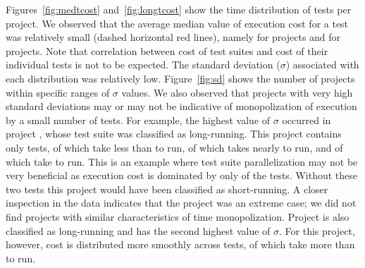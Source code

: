 \sloppy Figures~\ref{fig:medtcost} and~\ref{fig:longtcost} show the
time distribution of tests per project.  We observed that the average
median value of execution cost for a test was relatively small (dashed
horizontal red lines), namely  for \medg{} projects and
 for \longg{} projects.  Note that correlation between cost
of test suites and cost of their individual tests is not to be
expected.  The standard deviation ($\sigma$) associated with each
distribution was relatively low.  Figure~\ref{fig:sd} shows the number
of projects within specific ranges of $\sigma$ values.  We also
observed that projects with very high standard deviations may or may
not be indicative of monopolization of execution by a small number of
tests.  For example, the highest value of $\sigma$ occurred in project
, whose test suite was classified as
long-running.  This project contains only  tests,  of
which take less than  to run,  of which takes nearly
 to run, and  of which take  to run.  This is
an example where test suite parallelization may not be very beneficial
as  execution cost is dominated by only  of the
tests.  Without these two tests this project would have been
classified as short-running.  A closer inspection in the data
indicates that the project  was an extreme case;
we did not find projects with similar characteristics of time
monopolization.  Project  is
also classified as long-running and has the second highest value of
$\sigma$.  For this project, however, cost is distributed more
smoothly across  tests, of which  take more than
 to run.  

\begin{center}
\end{center}


